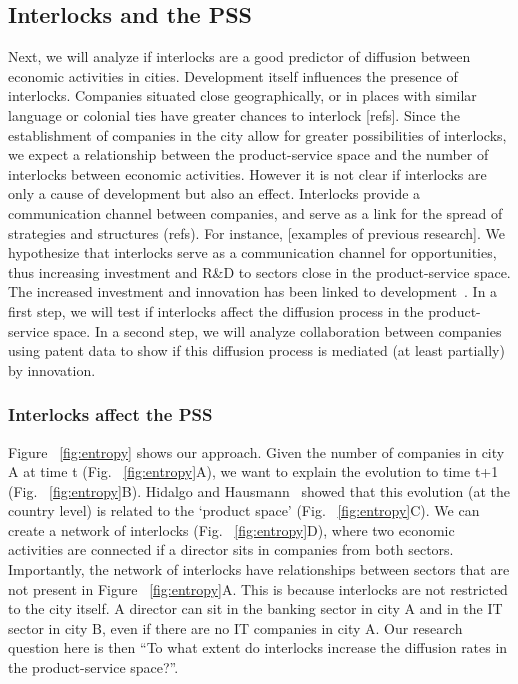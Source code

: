 \subsection{Interlocks and the PSS}
\label{sec:interlockspss}
Next, we will analyze if interlocks are a good predictor of diffusion between economic activities in cities. 
Development itself influences the presence of interlocks.
Companies situated close geographically, or in places with similar language or colonial ties 
have greater chances to interlock [refs].
Since the establishment of companies in the city allow for greater possibilities of interlocks,
we expect a relationship between the product-service space and the number of interlocks between economic activities.
However it is not clear if interlocks are only a cause of development but also an effect.
Interlocks provide a communication channel between companies, 
and serve as a link for the spread of strategies and structures (refs).
For instance, [examples of previous research].
We hypothesize that interlocks serve as a communication channel for opportunities,
thus increasing investment and R\&D to sectors close in the product-service space.
The increased investment and innovation has been linked to development~\citep{Romer1991,grossman1991,hidalgo2007}.
In a first step, we will test if interlocks affect the diffusion process in the product-service space.
In a second step, we will analyze collaboration between companies using patent data to show if this diffusion process is mediated (at least partially) by innovation.

\subsubsection{Interlocks affect the PSS}
Figure ~\ref{fig:entropy} shows our approach. 
Given the number of companies in city A at time t (Fig. ~\ref{fig:entropy}A), 
we want to explain the evolution to time t+1 (Fig. ~\ref{fig:entropy}B).
Hidalgo and Hausmann~\cite{hidalgo2009} showed that this evolution (at the country level) is related to the `product space' (Fig. ~\ref{fig:entropy}C).
We can create a network of interlocks (Fig. ~\ref{fig:entropy}D),
where two economic activities are connected if a director sits in companies from both sectors.
Importantly, the network of interlocks have relationships between sectors that are not present in Figure ~\ref{fig:entropy}A. 
This is because interlocks are not restricted to the city itself.
A director can sit in the banking sector in city A and in the IT sector in city B, even if there are no IT companies in city A.
Our research question here is then ``To what extent do interlocks increase the diffusion rates in the product-service space?''.


